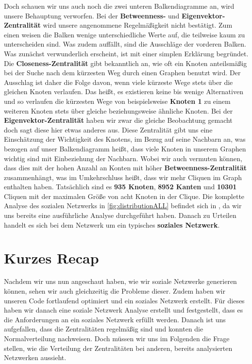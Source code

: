 Doch schauen wir uns auch noch die zwei unteren Balkendiagramme an, wird unsere Behauptung verworfen. Bei der \textbf{Betweenness-} und \textbf{Eigenvektor-Zentralität} wird unsere angenommene Regelmäßigkeit nicht bestätigt. Zum einen weisen die Balken wenige unterschiedliche Werte auf, die teilweise kaum zu unterscheiden sind. Was zudem auffällt, sind die Ausschläge der vorderen Balken. Was zunächst verwunderlich erscheint, ist mit einer simplen Erklärung begründet. Die \textbf{Closeness-Zentralität} gibt bekanntlich an, wie oft ein Knoten anteilsmäßig bei der Suche nach dem kürzesten Weg durch einen Graphen benutzt wird. Der Ausschlag ist daher die Folge davon, wenn viele kürzeste Wege stets über die gleichen Knoten verlaufen. Das heißt, es existieren keine bis wenige Alternativen und so verlaufen die kürzesten Wege von beispielsweise \textbf{Knoten 1} zu einem weiteren Knoten stets über gleiche beziehungsweise ähnliche Knoten. Bei der \textbf{Eigenvektor-Zentralität} haben wir zwar die gleiche Beobachtung gemacht doch sagt diese hier etwas anderes aus. Diese Zentralität gibt uns eine Einschätzung der Wichtigkeit des Knotens, im Bezug auf seine Nachbarn an, was bezogen auf unser Balkendiagramm heißt, dass viele Knoten in unserem Graphen wichtig sind mit Einbeziehung der Nachbarn. Wobei wir auch vermuten können, dass dies mit der hohen Anzahl an Konten mit höher \textbf{Betweenness-Zentralität} zusammenhängt, was im Umkehrschluss heißt, dass wir mehr Cliquen im Graph enthalten haben. Tatsächlich sind es \textbf{935 Knoten}, \textbf{8952 Kanten} und \textbf{10301} Cliquen mit der maximalen Größe von acht Knoten in der Clique.
Die komplette Analyse des sozialen Netzwerks in \ref{fig:distributionALL} befindet sich in \cite{TZ}, da wir uns bereits eine ausführliche Analyse durchgeführt haben. Danach zu Urteilen handelt es sich bei dem Netzwerk um ein typisches \textbf{soziales Netzwerk}.

\section{Kurzes Recap}
Nachdem wir uns nun angeschaut haben, wie wir soziale Netzwerke generieren können, sehen wir auch gleichzeitig die Probleme dieser. Zudem haben wir unseren Code fortlaufend optimiert und ein soziales Netzwerk erstellt. Für dieses haben wir danach eine soziale Netzwerk Analyse erstellt und festgestellt, dass es die Anforderungen an ein soziales Netzwerk erfüllt werden. Danach ist uns aufgefallen, dass die Zentralitäten regelmäßig sind und konnten die Normalverteilung nachweisen. Doch müssen wir uns im Folgenden die Frage stellen, wie die Verteilung der Zentralitäten bei anderen, bereits analysierten Netzwerken aussieht.
